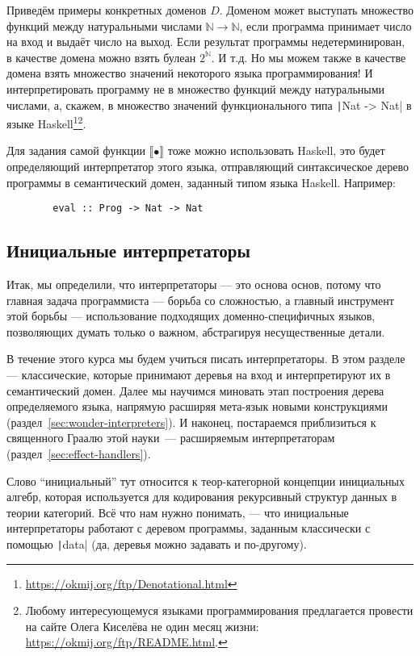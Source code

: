\documentclass[12pt]{article}
\newcommand{\sembr}[1]{\llbracket{#1}\rrbracket} %
\begin{document}
    Приведём примеры конкретных доменов $D$.
    Доменом может выступать множество функций между натуральными числами $\mathbb{N}\to\mathbb{N}$, если программа принимает число на вход и выдаёт число на выход.
    Если результат программы недетерминирован, в качестве домена можно взять булеан $2^\mathbb{N}$.
    И т.д.
    Но мы можем также в качестве домена взять множество значений некоторого языка программирования!
    И интерпретировать программу не в множество функций между натуральными числами, а, скажем, в множество значений функционального типа \texttt|Nat -> Nat| в языке Haskell\footnote{\url{https://okmij.org/ftp/Denotational.html}}\footnote{Любому интересующемуся языками программирования предлагается провести на сайте Олега Киселёва не один месяц жизни: \url{https://okmij.org/ftp/README.html}.}.

    Для задания самой функции $\sembr{\bullet}$ тоже можно использовать Haskell, это будет определяющий интерпретатор этого языка, отправляющий синтаксическое дерево программы в семантический домен, заданный типом языка Haskell.
    Например:
    \begin{verbatim}
        eval :: Prog -> Nat -> Nat
    \end{verbatim}

    \subsection{Инициальные интерпретаторы}

    Итак, мы определили, что интерпретаторы --- это основа основ, потому что главная задача программиста --- борьба со сложностью, а главный инструмент этой борьбы --- использование подходящих доменно-специфичных языков, позволяющих думать только о важном, абстрагируя несущественные детали.

    В течение этого курса мы будем учиться писать интерпретаторы.
    В этом разделе --- классические, которые принимают деревья на вход и интерпретируют их в семантический домен.
    Далее мы научимся миновать этап построения дерева определяемого языка, напрямую расширяя мета-язык новыми конструкциями (раздел~\ref{sec:wonder-interpreters}).
    И наконец, постараемся приблизиться к священного Граалю этой науки~--- расширяемым интерпретаторам (раздел~\ref{sec:effect-handlers}).


    Слово ``инициальный'' тут относится к теор-категорной концепции инициальных алгебр, которая используется для кодирования рекурсивный структур данных в теории категорий.
    Всё что нам нужно понимать, --- что инициальные интерпретаторы работают с деревом программы, заданным классически с помощью \texttt|data| (да, деревья можно задавать и по-другому).
\end{document}
